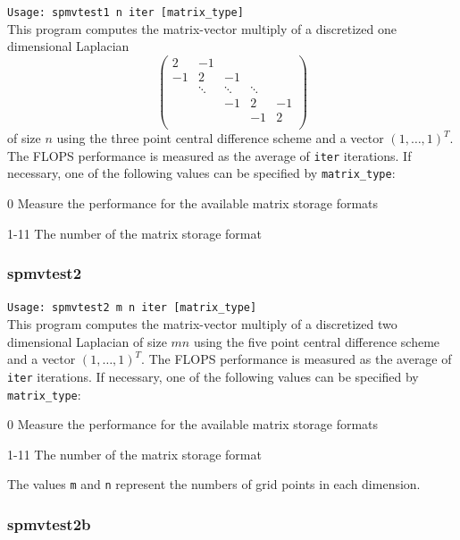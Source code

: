 \documentclass[a4paper]{article}
\newcommand{\namelistlabel}[1]{\mbox{#1}\hfill}
\newenvironment{namelist}[1]{%
\begin{list}{}
  {\let\makelabel\namelistlabel
  \settowidth{\labelwidth}{#1}
  \setlength{\leftmargin}{1.1\labelwidth}}
  }{%
\end{list}}
\begin{document}
\verb+Usage: spmvtest1 n iter [matrix_type]+\\

This program computes the matrix-vector multiply of a discretized one dimensional Laplacian
\[
\left(
\begin{array}{ccccc}
2 & -1 &   &  &   \\
-1 & 2 & -1 &  &   \\
  & \ddots  & \ddots  & \ddots  &   \\
  &   & -1 & 2 & -1 \\
  &   &   & -1 & 2 \\
\end{array}
\right)
\]
of size $n$ using the three point central difference scheme
and a vector $(1,\dots,1)^T$.
The FLOPS performance is measured as the average of {\tt iter}
iterations.
If necessary, one of the following values can be specified by {\tt matrix\_type}:
\begin{namelist}{XXXXXXXXXXXXXXXXXXXX}
\item[0] Measure the performance for the available matrix storage formats
\item[1-11] The number of the matrix storage format
\end{namelist}

\subsubsection{spmvtest2}

\verb+Usage: spmvtest2 m n iter [matrix_type]+\\

This program computes the matrix-vector multiply of a 
discretized two dimensional Laplacian of size $mn$ using 
the five point central difference scheme 
and a vector $(1,\dots,1)^T$. 
The FLOPS performance is measured as the average of {\tt iter}
iterations.
If necessary, one of the following values can be specified by {\tt matrix\_type}:
\begin{namelist}{XXXXXXXXXXXXXXXXXXXX}
\item[0] Measure the performance for the available matrix storage formats
\item[1-11] The number of the matrix storage format
\end{namelist}
The values {\tt m} and {\tt n} represent the numbers of grid points 
in each dimension. 

\subsubsection{spmvtest2b}
\end{document}
